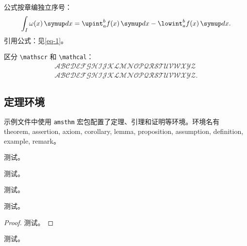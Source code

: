 公式按章编独立序号：
\begin{equation} \label{eq-1}
	\int_I \omega(x)\diff x = \upint_{a}^b f(x)\diff x - \lowint_a^b f(x)\diff x.
\end{equation}
引用公式：见\autoref{eq-1}。

区分 \verb|\mathscr| 和 \verb|\mathcal|：
\begin{gather*}
	\mathscr{A} \mathscr{B} \mathscr{C} \mathscr{D} \mathscr{E} \mathscr{F} \mathscr{G} \mathscr{H} \mathscr{I} \mathscr{J} \mathscr{K} \mathscr{L} \mathscr{M} \mathscr{N} \mathscr{O} \mathscr{P} \mathscr{Q} \mathscr{R} \mathscr{S} \mathscr{T} \mathscr{U} \mathscr{V} \mathscr{W} \mathscr{X} \mathscr{Y} \mathscr{Z}\\
	\mathcal{A} \mathcal{B} \mathcal{C} \mathcal{D} \mathcal{E} \mathcal{F} \mathcal{G} \mathcal{H} \mathcal{I} \mathcal{J} \mathcal{K} \mathcal{L} \mathcal{M} \mathcal{N} \mathcal{O} \mathcal{P} \mathcal{Q} \mathcal{R} \mathcal{S} \mathcal{T} \mathcal{U} \mathcal{V} \mathcal{W} \mathcal{X} \mathcal{Y} \mathcal{Z}.
\end{gather*}

\subsection{定理环境}

示例文件中使用 \verb|amsthm| 宏包配置了定理、引理和证明等环境。环境名有\\ \textsf{theorem}, \textsf{assertion}, \textsf{axiom}, \textsf{corollary}, \textsf{lemma}, \textsf{proposition}, \textsf{assumption}, \textsf{definition}, \textsf{example}, \textsf{remark}。

\begin{assertion} \label{assertion-1}
	测试。
\end{assertion}

\begin{assumption} \label{assumption-1}
	测试。
\end{assumption}

\begin{axiom} \label{axiom-1}
	测试。
\end{axiom}

\begin{example} \label{example-1}
	测试。
\end{example}

\begin{proof}
	测试。
\end{proof}

\begin{proposition} \label{proposition-1}
	测试。
\end{proposition}

